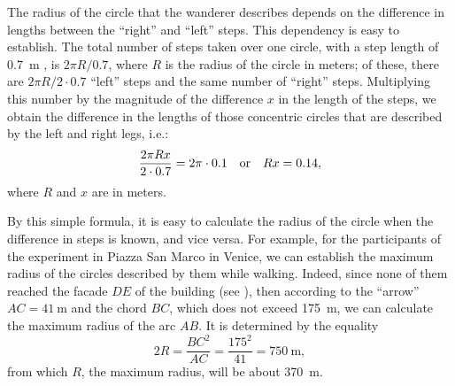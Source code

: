 The radius of the circle that the wanderer describes depends on the difference in lengths between the ``right'' and ``left'' steps. This dependency is easy to establish. The total number of steps taken over one circle, with a step length of \SI{0.7}{\meter} , is $2\pi R/0.7$, where $R$ is the radius of the circle in meters; of these, there are $2 \pi R/2 \cdot 0.7$ ``left'' steps and the same number of ``right'' steps. Multiplying this number by the magnitude of the difference $x$ in the length of the steps, we obtain the difference in the lengths of those concentric circles that are described by the left and right legs, i.e.:
\begin{equation*}%
\frac{2\pi Rx}{2 \cdot 0.7} = 2\pi \cdot 0.1 \qor Rx = 0.14,
\end{equation*}
where $R$ and $x$ are in meters.

By this simple formula, it is easy to calculate the radius of the circle when the difference in steps is known, and vice versa. For example, for the participants of the experiment in Piazza San Marco in Venice, we can establish the maximum radius of the circles described by them while walking. Indeed, since none of them reached the facade $DE$ of the building (see ), then according to the ``arrow'' $AC = \SI{41}{\meter}$ and the chord $BC$, which does not exceed \SI{175}{\meter}, we can calculate the maximum radius of the arc $AB$. It is determined by the equality
\begin{equation*}%
2R = \frac{BC^{2}}{AC} = \frac{175^{2}}{41} = \SI{750}{\meter}, 
\end{equation*}
from which $R$, the maximum radius, will be about \SI{370}{\meter}. 

